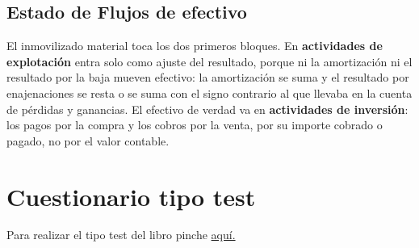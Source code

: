 \documentclass[a4paper,12pt]{article}
\begin{document}
\subsection{Estado de Flujos de efectivo}
El inmovilizado material toca los dos primeros bloques. En \textbf{actividades de
explotación} entra solo como ajuste del resultado, porque ni la amortización ni el
resultado por la baja mueven efectivo: la amortización se suma y el resultado por
enajenaciones se resta o se suma con el signo contrario al que llevaba en la cuenta
de pérdidas y ganancias. El efectivo de verdad va en \textbf{actividades de
inversión}: los pagos por la compra y los cobros por la venta, por su importe
cobrado o pagado, no por el valor contable.

\section{Cuestionario tipo test}
Para realizar el tipo test del libro pinche \href{https://elblogdeismael.github.io/Subjects/Third/CF1/Tests/testT5Libro.html}{aquí.}
\end{document}
